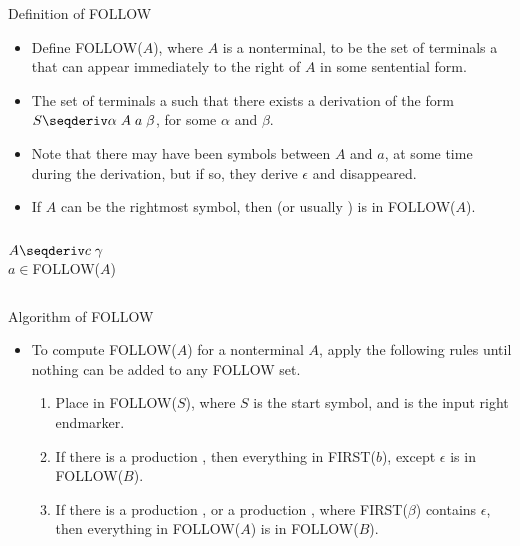 \begin{bibunit}[apalike]
\begin{frame}{Definition of FOLLOW}
	\begin{scriptsize}
	\begin{itemize}
	\item Define FOLLOW($A$), where $A$ is a nonterminal, to be the set of terminals a that can appear immediately to the right of $A$ in some sentential form.
	\item The set of terminals a such that there exists a derivation of the form $S \seqderiv \alpha\;A\;a\;\beta$, for some $\alpha$ and $\beta$.
	\item Note that there may have been symbols between $A$ and $a$, at some time during the derivation, but if so, they derive $\epsilon$ and disappeared.
	\item If $A$ can be the rightmost symbol, then  (or usually \tok{\$}) is in FOLLOW($A$).
	\end{itemize}
	\end{scriptsize}
	\vfill
	\begin{small}
	\begin{example}\bnfstyle
		\begin{columns}
			\begin{column}[t]{.4\linewidth}
				$A \seqderiv c\;\gamma$ \\
				$a \in $FOLLOW($A$)
			\end{column}
			\begin{column}[t]{.4\linewidth}
			\end{column}
		\end{columns}
	\end{example}
	\end{small}
\end{frame}

\begin{frame}{Algorithm of FOLLOW}
	\begin{itemize}
	\item To compute FOLLOW($A$) for a nonterminal $A$, apply the following rules until nothing can be added to any FOLLOW set.
		\begin{enumerate}
		\vfill
		\item Place  in FOLLOW($S$), where $S$ is the start symbol, and  is the input right endmarker.
		\vfill
		\item If there is a production , then everything in FIRST($b$), except $\epsilon$ is in FOLLOW($B$).
		\vfill
		\item If there is a production , or a production , where FIRST($\beta$) contains $\epsilon$, then everything in FOLLOW($A$) is in FOLLOW($B$).
		\end{enumerate}
	\end{itemize}
\end{frame}


\end{bibunit}
